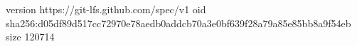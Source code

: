 version https://git-lfs.github.com/spec/v1
oid sha256:d05df89d517cc72970e78aedb0addcb70a3e0bf639f28a79a85e85bb8a9f54eb
size 120714
